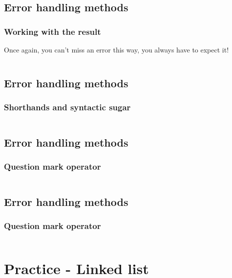 \documentclass[usenames,twocolumn,dvipsnames,10pt,a4wide]{article}
\begin{document}
\inputminted[fontsize=\normalsize]{rust}{code/error2.rs}



\subsection{Error handling methods}
\subsubsection{Working with the result}
Once again, you can't miss an error this way,
you always have to expect it!

\inputminted[fontsize=\normalsize]{rust}{code/error3.rs}



\subsection{Error handling methods}
\subsubsection{Shorthands and syntactic sugar}
\normalsize
\inputminted[fontsize=\normalsize]{rust}{code/error4.rs}


\subsection{Error handling methods}
\subsubsection{Question mark operator}
\inputminted[fontsize=\normalsize]{rust}{code/error5.rs}



\subsection{Error handling methods}
\subsubsection{Question mark operator}
\inputminted[fontsize=\normalsize]{rust}{code/error6.rs}



\section{Practice - Linked list}
\end{document}
